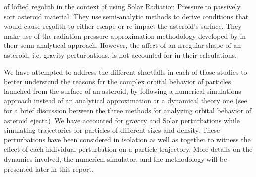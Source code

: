 of lofted regolith in the context of using Solar Radiation Pressure to passively sort asteroid material. They use semi-analytic methods to derive conditions that would cause regolith to either escape or re-impact the asteroid’s surface. They make use of the radiation pressure approximation methodology developed by \cite{richter1995stability} in their semi-analytical approach. However, the affect of an irregular shape of an asteroid, i.e. gravity perturbations, is not accounted for in their calculations.

We have attempted to address the different shortfalls in each of those studies to better understand the reasons for the complex orbital behavior of particles launched from the surface of an asteroid, by following a numerical simulations approach instead of an analytical approximation or a dynamical theory one (see \cite{scheeres2002fate} for a brief discussion between the three methods for analyzing orbital behavior of asteroid ejecta). We have accounted for gravity and Solar perturbations while simulating trajectories for particles of different sizes and density. These perturbations have been considered in isolation as well as together to witness the effect of each individual perturbation on a particle trajectory. More details on the dynamics involved, the numerical simulator, and the methodology will be presented later in this report.

